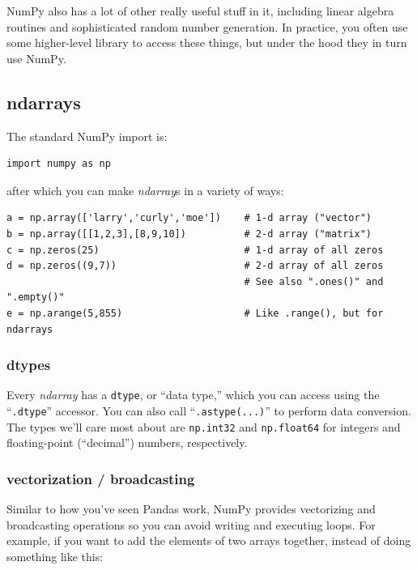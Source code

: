 NumPy also has a lot of other really useful stuff in it, including linear
algebra routines and sophisticated random number generation. In practice, you
often use some higher-level library to access these things, but under the hood
they in turn use NumPy.

\subsection{ndarrays}

The standard NumPy import is:

\begin{Verbatim}[fontsize=\small,samepage=true,frame=single]
import numpy as np
\end{Verbatim}

after which you can make \textit{ndarray}s in a variety of ways:

\begin{Verbatim}[fontsize=\footnotesize,samepage=true,frame=single]
a = np.array(['larry','curly','moe'])    # 1-d array ("vector")
b = np.array([[1,2,3],[8,9,10])          # 2-d array ("matrix")
c = np.zeros(25)                         # 1-d array of all zeros
d = np.zeros((9,7))                      # 2-d array of all zeros
                                         # See also ".ones()" and ".empty()"
e = np.arange(5,855)                     # Like .range(), but for ndarrays

\end{Verbatim}

\subsubsection{dtypes}

Every \textit{ndarray} has a \texttt{dtype}, or ``data type,'' which you can
access using the ``\texttt{.dtype}'' accessor. You can also call
``\texttt{.astype(...)}'' to perform data conversion. The types we'll care most
about are \texttt{np.int32} and \texttt{np.float64} for integers and
floating-point (``decimal'') numbers, respectively.

\subsubsection{vectorization / broadcasting}

Similar to how you've seen Pandas work, NumPy provides vectorizing and
broadcasting operations so you can avoid writing and executing loops. For
example, if you want to add the elements of two arrays together, instead of
doing something like this:

